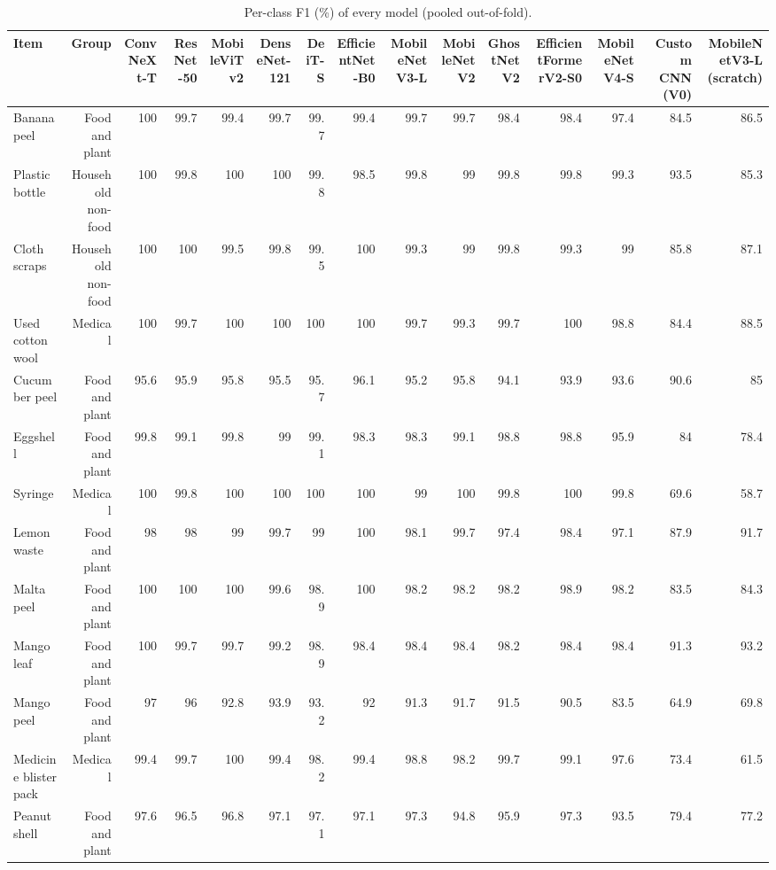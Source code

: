 \begin{table}[!htbp]
\centering
\tiny
\caption{Per-class F1 (\%) of every model (pooled out-of-fold).}
\label{tab:s_perclass}
\begin{adjustbox}{max width=\textwidth}
\begin{tabular}{@{}lrrrrrrrrrrrrrr@{}}
\toprule
Item & Group & ConvNeXt-T & ResNet-50 & MobileViTv2 & DenseNet-121 & DeiT-S & EfficientNet-B0 & MobileNetV3-L & MobileNetV2 & GhostNetV2 & EfficientFormerV2-S0 & MobileNetV4-S & Custom CNN (V0) & MobileNetV3-L (scratch) \\
\midrule
Banana peel & Food and plant & 100 & 99.7 & 99.4 & 99.7 & 99.7 & 99.4 & 99.7 & 99.7 & 98.4 & 98.4 & 97.4 & 84.5 & 86.5 \\
Plastic bottle & Household non-food & 100 & 99.8 & 100 & 100 & 99.8 & 98.5 & 99.8 & 99 & 99.8 & 99.8 & 99.3 & 93.5 & 85.3 \\
Cloth scraps & Household non-food & 100 & 100 & 99.5 & 99.8 & 99.5 & 100 & 99.3 & 99 & 99.8 & 99.3 & 99 & 85.8 & 87.1 \\
Used cotton wool & Medical & 100 & 99.7 & 100 & 100 & 100 & 100 & 99.7 & 99.3 & 99.7 & 100 & 98.8 & 84.4 & 88.5 \\
Cucumber peel & Food and plant & 95.6 & 95.9 & 95.8 & 95.5 & 95.7 & 96.1 & 95.2 & 95.8 & 94.1 & 93.9 & 93.6 & 90.6 & 85 \\
Eggshell & Food and plant & 99.8 & 99.1 & 99.8 & 99 & 99.1 & 98.3 & 98.3 & 99.1 & 98.8 & 98.8 & 95.9 & 84 & 78.4 \\
Syringe & Medical & 100 & 99.8 & 100 & 100 & 100 & 100 & 99 & 100 & 99.8 & 100 & 99.8 & 69.6 & 58.7 \\
Lemon waste & Food and plant & 98 & 98 & 99 & 99.7 & 99 & 100 & 98.1 & 99.7 & 97.4 & 98.4 & 97.1 & 87.9 & 91.7 \\
Malta peel & Food and plant & 100 & 100 & 100 & 99.6 & 98.9 & 100 & 98.2 & 98.2 & 98.2 & 98.9 & 98.2 & 83.5 & 84.3 \\
Mango leaf & Food and plant & 100 & 99.7 & 99.7 & 99.2 & 98.9 & 98.4 & 98.4 & 98.4 & 98.2 & 98.4 & 98.4 & 91.3 & 93.2 \\
Mango peel & Food and plant & 97 & 96 & 92.8 & 93.9 & 93.2 & 92 & 91.3 & 91.7 & 91.5 & 90.5 & 83.5 & 64.9 & 69.8 \\
Medicine blister pack & Medical & 99.4 & 99.7 & 100 & 99.4 & 98.2 & 99.4 & 98.8 & 98.2 & 99.7 & 99.1 & 97.6 & 73.4 & 61.5 \\
Peanut shell & Food and plant & 97.6 & 96.5 & 96.8 & 97.1 & 97.1 & 97.1 & 97.3 & 94.8 & 95.9 & 97.3 & 93.5 & 79.4 & 77.2 \\

\end{tabular}
\end{adjustbox}
\end{table}
